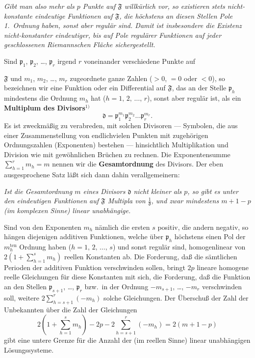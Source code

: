 \documentclass{article}
\begin{document}
\emph{Gibt man also mehr als $p$ Punkte auf $\mathfrak{F}$ willkürlich vor, so existieren stets nicht-konstante eindeutige Funktionen auf $\mathfrak{F}$, die höchstens an diesen Stellen Pole 1.\ Ordnung haben, sonst aber regulär sind. Damit ist insbesondere die Existenz nicht-konstanter eindeutiger, bis auf Pole regulärer Funktionen auf jeder geschlossenen Riemannschen Fläche sichergestellt.}

Sind $\mathfrak{p}_1$, $\mathfrak{p}_2$, \dots, $\mathfrak{p}_r$ irgend $r$ voneinander verschiedene Punkte auf

$\mathfrak{F}$ und $m_1$, $m_2$, \dots, $m_r$ zugeordnete ganze Zahlen ($> 0$, $= 0$ oder $< 0$), so bezeichnen wir eine Funktion oder ein Differential auf $\mathfrak{F}$, das an der Stelle $\mathfrak{p}_h$ mindestens die Ordnung $m_h$ hat ($h = 1, \, 2, \, \dots, \, r$), sonst aber regulär ist, als ein \textbf{Multiplum des Divisors}${}^{1)}$
\[ \mathfrak{d} = \mathfrak{p}_1^{m_1} \mathfrak{p}_2^{m_2} \dots \mathfrak{p}_r^{m_r}. \]
Es ist zweckmäßig zu verabreden, mit solchen Divisoren --- Symbolen, die aus einer Zusammenstellung von endlichvielen Punkten mit zugehörigen Ordnungszahlen (Exponenten) bestehen --- hinsichtlich Multiplikation und Division wie mit gewöhnlichen Brüchen zu rechnen. Die Exponentensumme $\displaystyle\sum_{h=1}^r m_h = m$ nennen wir die \textbf{Gesamtordnung} des Divisors. Der eben ausgesprochene Satz läßt sich dann dahin verallgemeinern:

\emph{Ist die Gesamtordnung $m$ eines Divisors $\mathfrak{d}$ nicht kleiner als $p$, so gibt es unter den eindeutigen Funktionen auf $\mathfrak{F}$ Multipla von $\frac{1}{\mathfrak{d}}$, und zwar mindestens $m + 1 - p$ (im komplexen Sinne) linear unabhängige.}

Sind von den Exponenten $m_h$ nämlich die ersten $s$ positiv, die andern negativ, so hängen diejenigen additiven Funktionen, welche über $\mathfrak{p}_h$ höchstens einen Pol der $m_h^{\text{ten}}$ Ordnung haben ($h = 1, \, 2, \, \dots, \, s$) und sonst regulär sind, homogenlinear von $2\left(1 + \displaystyle\sum_{h=1}^s m_h\right)$ reellen Konstanten ab. Die Forderung, daß die sämtlichen Perioden der additiven Funktion verschwinden sollen, bringt $2p$ lineare homogene reelle Gleichungen für diese Konstanten mit sich, die Forderung, daß die Funktion an den Stellen $\mathfrak{p}_{s+1}$, \dots, $\mathfrak{p}_r$ bzw.\ in der Ordnung $-m_{s+1}$, \dots, $-m_r$ verschwinden soll, weitere $2\displaystyle\sum_{h=s+1}^r (-m_h)$ solche Gleichungen. Der Überschuß der Zahl der Unbekannten über die Zahl der Gleichungen
\[ 2\left(1 + \sum_{h=1}^s m_h\right) - 2p - 2\sum_{h=s+1}^r (-m_h) = 2(m + 1 - p) \]
gibt eine untere Grenze für die Anzahl der (im reellen Sinne) linear unabhängigen Lösungssysteme.
\end{document}

